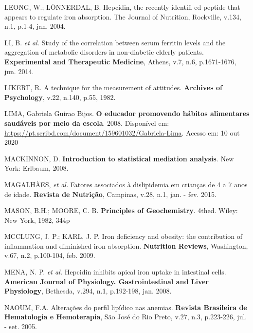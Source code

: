 \bigbreak

\noindent LEONG, W.; LÖNNERDAL, B. Hepcidin, the recently identifi ed peptide that appears to regulate iron absorption. The Journal of Nutrition, Rockville, v.134, n.1, p.1-4, jan. 2004.

\bigbreak

\noindent LI, B. \textit{et al.} Study of the correlation between serum ferritin levels and the aggregation of metabolic disorders in non-diabetic elderly patients. \textbf{Experimental and Therapeutic Medicine}, Athens, v.7, n.6, p.1671-1676, jun. 2014.

\bigbreak

\noindent LIKERT, R. A technique for the measurement of attitudes. \textbf{Archives of Psychology}, v.22, n.140, p.55, 1982. 

\bigbreak

\noindent LIMA, Gabriela Guirao Bijos. \textbf{O educador promovendo hábitos alimentares saudáveis por meio da escola}. 2008. Disponível em: \url{https://pt.scribd.com/document/159601032/Gabriela-Lima}. Acesso em: 10 out 2020

\bigbreak

\noindent MACKINNON, D. \textbf{Introduction to statistical mediation analysis}. New York: Erlbaum, 2008.

\bigbreak

\noindent MAGALHÃES, \textit{et al.} Fatores associados à dislipidemia em crianças de 4 a 7 anos de idade. \textbf{Revista de Nutrição}, Campinas, v.28, n.1, jan. - fev. 2015.

\bigbreak

\noindent MASON, B.H.; MOORE, C. B. \textbf{Principles of Geochemistry}. 4thed. Wiley: New York, 1982, 344p 

\bigbreak

\noindent MCCLUNG, J. P.; KARL, J. P. Iron deficiency and obesity: the contribution of inflammation and diminished iron absorption. \textbf{Nutrition Reviews}, Washington, v.67, n.2, p.100-104, feb. 2009.

\bigbreak

\noindent MENA, N. P. \textit{et al.} Hepcidin inhibits apical iron uptake in intestinal cells. \textbf{American Journal of Physiology. Gastrointestinal and Liver Physiology}, Bethesda, v.294, n.1, p.192-198, jan. 2008. 

\bigbreak

\noindent NAOUM, F.A. Alterações do perfil lipídico nas anemias. \textbf{Revista Brasileira de Hematologia e Hemoterapia}, São José do Rio Preto, v.27, n.3, p.223-226, jul. - set. 2005.

